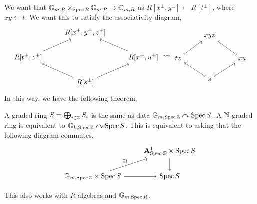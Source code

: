 We want that $\mathbb G_{m, R} \times_{\operatorname{Spec} R} \mathbb G_{m, R} \to \mathbb G_{m, R}$ as $R[x^\pm, y^\pm] \leftarrow R[t^\pm]$, where $xy \mapsfrom t$. We want this to satisfy the associativity diagram,
\[ \begin{tikzcd} & R[x^\pm, y^\pm, z^\pm] \\ R[t^\pm, z^\pm] \arrow[ur] & & R[x^\pm, u^\pm] \arrow[ul] \\ & R[s^\pm] \arrow[ul] \arrow[ur] \end{tikzcd} \leadsto \begin{tikzcd} & xyz \\ tz \arrow[ur, maps to] & & xu \arrow[ul, maps to] \\ & s \arrow[ul, maps to] \arrow[ur, maps to] \end{tikzcd} \]
In this way, we have the following theorem,
\begin{theorem} \label{thm:graded_ring_same_as_group_action_data}
    A graded ring $S = \bigoplus_{i \in \mathbb Z} S_i$ is the same as data $\mathbb G_{m, \operatorname{Spec} \mathbb Z} \curvearrowright \operatorname{Spec} S$. A $\mathbb N$-graded ring is equivalent to $\mathbb G_{k, \operatorname{Spec} \mathbb Z} \curvearrowright \operatorname{Spec} S$. This is equivalent to asking that the following diagram commutes,
    \[ \begin{tikzcd}
        & \mbf A_{\Spec Z}^1 \times \Spec S \arrow[d] \\ \mathbb G_{m, \Spec \ZZ} \times \Spec S \arrow[ur, "\exists !"] \arrow[r] & \Spec S
    \end{tikzcd} \]
\end{theorem}
This also works with $R$-algebras and $\mathbb G_{m, \operatorname{Spec} R}$.